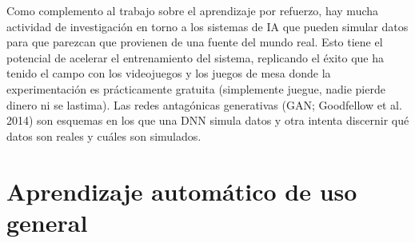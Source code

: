 Como complemento al trabajo sobre el aprendizaje por refuerzo, hay mucha actividad de investigación en torno a los sistemas de IA que pueden simular datos para que parezcan que provienen de una fuente del mundo real. Esto tiene el potencial de acelerar el entrenamiento del sistema, replicando el éxito que ha tenido el campo con los videojuegos y los juegos de mesa donde la experimentación es prácticamente gratuita (simplemente juegue, nadie pierde dinero ni se lastima). Las redes antagónicas generativas (GAN; Goodfellow et al. 2014) son esquemas en los que una DNN simula datos y otra intenta discernir qué datos son reales y cuáles son simulados.

\section{Aprendizaje automático de uso general}

